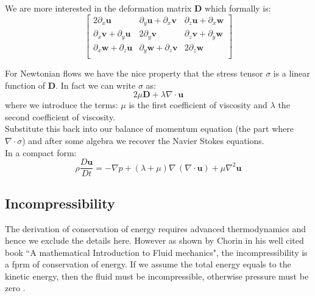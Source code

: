 We are more interested in the deformation matrix $\textbf{D}$ which formally is:
\begin{equation*}
\begin{bmatrix}
2\partial_x\textbf{u} & \partial_y\textbf{u}+\partial_x\textbf{v}& \partial_z\textbf{u}+\partial_x\textbf{w}\\
\partial_x\textbf{v}+\partial_y\textbf{u} & 2\partial_y\textbf{v} & \partial_z\textbf{v}+\partial_y\textbf{w}\\
\partial_x\textbf{w}+\partial_z\textbf{u} & \partial_y\textbf{w}+\partial_z\textbf{v}& 2\partial_z\textbf{w}\\
\end{bmatrix}
\end{equation*}

For Newtonian flows we have the nice property that the stress tensor $\textbf{$\sigma$}$ is a linear function of $\textbf{D}$. In fact we can write $\textbf{$\sigma$}$ as:
\begin{equation}
2\mu \textbf{D} + \lambda\nabla \cdot \textbf{u}
\end{equation}
where we introduce the terms: $\mu$ is the first coefficient of viscosity and $\lambda$ the second coefficient of viscosity.\\

Substitute this back into our balance of momentum equation (the part where $\nabla \cdot \textbf{$\sigma$}$) and after some algebra we recover the Navier Stokes equations.\\
In a compact form:
\begin{equation}
\rho \dfrac{D\textbf{u}}{Dt} = -\nabla p + (\lambda + \mu)\nabla \,(\nabla \cdot\textbf{u}) + \mu \nabla^2 \textbf{u}
\end{equation}

\subsection{Incompressibility}
The derivation of conservation of energy requires advanced thermodynamics and hence we exclude the details here. However as shown by Chorin in his well cited book ``A mathematical Introduction to Fluid mechanics", the incompressibility is a fprm of conservation of energy. If we assume the total energy equals to the kinetic energy, then the fluid must be incompressible, otherwise pressure must be zero \cite{chorin1990mathematical}.\\

